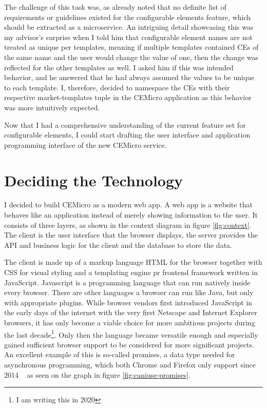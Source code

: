 The challenge of this task was, as already noted that no definite list of requirements or guidelines existed for the configurable elements feature, which should be extracted as a microservice. An intriguing detail showcasing this was my advisor's surprise when I told him that configurable element names are not treated as unique per templates, meaning if multiple templates contained CEs of the same name and the user would change the value of one, then the change was reflected for the other templates as well. I asked him if this was intended behavior, and he answered that he had always assumed the values to be unique to each template. I, therefore, decided to namespace the CEs with their respective market-templates tuple in the CEMicro application as this behavior was more intuitively expected.

Now that I had a comprehensive understanding of the current feature set for configurable elements, I could start drafting the user interface and application programming interface of the new CEMicro service.


\section{Deciding the Technology}

I decided to build CEMicro as a modern web app. A web app is a website that behaves like an application instead of merely showing information to the user. It consists of three layers, as shown in the context diagram in figure \ref{fig:context}. The client is the user interface that the browser displays, the server provides the API and business logic for the client and the database to store the data.

The client is made up of a markup language HTML for the browser together with CSS for visual styling and a templating engine pr frontend framework written in JavaScript. Javascript is a programming language that can run natively inside every browser. There are other languages a browser can run like Java, but only with appropriate plugins. While browser vendors first introduced JavaScript in the early days of the internet with the very first Netscape and Internet Explorer browsers, it has only become a viable choice for more ambitious projects during the last decade\footnote{I am writing this in 2020}. Only then the language became versatile enough and especially gained sufficient browser support to be considered for more significant projects. An excellent example of this is so-called promises, a data type needed for asynchronous programming, which both Chrome and Firefox only support since 2014 ~\cite{caniuse.2020} as seen on the graph in figure \ref{fig:caniuse-promises}.

